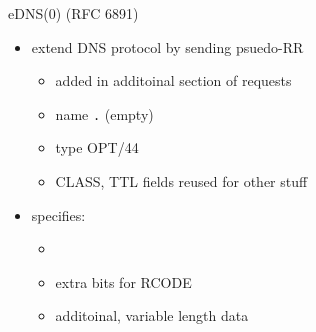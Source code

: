 \begin{frame}{eDNS(0) (RFC 6891)}
    \begin{itemize}
    \item extend DNS protocol by sending psuedo-RR
        \begin{itemize}
        \item added in additoinal section of requests
        \item name \texttt{.} (empty)
        \item type OPT/44
        \item CLASS, TTL fields reused for other stuff
        \end{itemize}
    \item specifies:
        \begin{itemize}
        \item {}
        \item extra bits for RCODE
        \item additoinal, variable length data
        \end{itemize}
    \end{itemize}
\end{frame}
